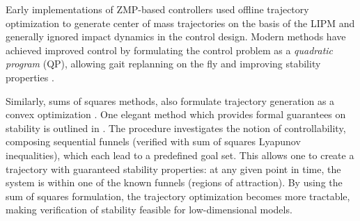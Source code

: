 Early implementations of ZMP-based controllers used offline trajectory optimization to generate center of mass trajectories on the basis of the LIPM and generally ignored impact dynamics in the control design. Modern methods have achieved improved control by formulating the control problem as a {\em quadratic program} (QP), allowing gait replanning on the fly and improving stability properties \cite{Kudoh2002,Stephens2010,Herdt2010}.
%

Similarly, sums of squares methods, also formulate trajectory generation as a convex optimization \cite{Tedrake2010}.
%
One elegant method which provides formal guarantees on stability is outlined in \cite{Majumdar2013}.
%
The procedure investigates the notion of controllability, composing sequential funnels (verified with sum of squares Lyapunov inequalities), which each lead to a predefined goal set.
%
This allows one to create a trajectory with guaranteed stability properties: at any given point in time, the system is within one of the known funnels (regions of attraction).
%
By using the sum of squares formulation, the trajectory optimization becomes more tractable, making verification of stability feasible for low-dimensional models.









